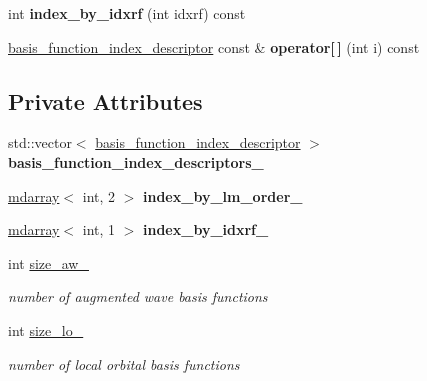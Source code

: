 \begin{DoxyCompactItemize}
\item 
\hypertarget{classsirius_1_1basis__functions__index_a290d20612512988ac4c5cc364463bbc7}{}int {\bfseries index\+\_\+by\+\_\+idxrf} (int idxrf) const \label{classsirius_1_1basis__functions__index_a290d20612512988ac4c5cc364463bbc7}

\item 
\hypertarget{classsirius_1_1basis__functions__index_ad5ba6d9821569e99ef98db1a0b4a58fc}{}\hyperlink{structbasis__function__index__descriptor}{basis\+\_\+function\+\_\+index\+\_\+descriptor} const \& {\bfseries operator\mbox{[}$\,$\mbox{]}} (int i) const \label{classsirius_1_1basis__functions__index_ad5ba6d9821569e99ef98db1a0b4a58fc}

\end{DoxyCompactItemize}
\subsection*{Private Attributes}
\begin{DoxyCompactItemize}
\item 
\hypertarget{classsirius_1_1basis__functions__index_ac29631cc1c66270d1aacb9f63ce3500f}{}std\+::vector$<$ \hyperlink{structbasis__function__index__descriptor}{basis\+\_\+function\+\_\+index\+\_\+descriptor} $>$ {\bfseries basis\+\_\+function\+\_\+index\+\_\+descriptors\+\_\+}\label{classsirius_1_1basis__functions__index_ac29631cc1c66270d1aacb9f63ce3500f}

\item 
\hypertarget{classsirius_1_1basis__functions__index_aa6e61a8163ad43918c1dcf60f66663f3}{}\hyperlink{classsddk_1_1mdarray}{mdarray}$<$ int, 2 $>$ {\bfseries index\+\_\+by\+\_\+lm\+\_\+order\+\_\+}\label{classsirius_1_1basis__functions__index_aa6e61a8163ad43918c1dcf60f66663f3}

\item 
\hypertarget{classsirius_1_1basis__functions__index_a1d45d25ce7207dd4d7c995ee125516fa}{}\hyperlink{classsddk_1_1mdarray}{mdarray}$<$ int, 1 $>$ {\bfseries index\+\_\+by\+\_\+idxrf\+\_\+}\label{classsirius_1_1basis__functions__index_a1d45d25ce7207dd4d7c995ee125516fa}

\item 
int \hyperlink{classsirius_1_1basis__functions__index_a51f2f5094dccfdd00e5ab36be1f2ab67}{size\+\_\+aw\+\_\+}
\begin{DoxyCompactList}\small\item\em number of augmented wave basis functions \end{DoxyCompactList}\item 
int \hyperlink{classsirius_1_1basis__functions__index_a52fffa1e907f3ef0d65dea8e93869db7}{size\+\_\+lo\+\_\+}
\begin{DoxyCompactList}\small\item\em number of local orbital basis functions \end{DoxyCompactList}\end{DoxyCompactItemize}


